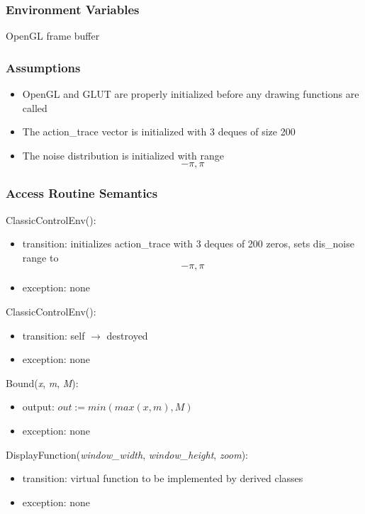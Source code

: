 \documentclass[12pt, titlepage]{article}
\begin{document}
\subsubsection{Environment Variables}
OpenGL frame buffer

\subsubsection{Assumptions}
\begin{itemize}
  \item OpenGL and GLUT are properly initialized before any drawing functions are called  
  \item The action\_trace vector is initialized with 3 deques of size 200
  \item The noise distribution is initialized with range \[-\pi, \pi\]

\end{itemize}
\begin{itemize}

\end{itemize}


\subsubsection{Access Routine Semantics}

\noindent ClassicControlEnv():
\begin{itemize}
  \item transition: initializes action\_trace with 3 deques of 200 zeros, sets dis\_noise range to\[-\pi, \pi\]
  
  \item exception: none

\end{itemize}


\noindent \texttildelow ClassicControlEnv():
\begin{itemize}
  \item transition: self $\rightarrow$ destroyed
  \item exception: none
\end{itemize}

\noindent Bound(\textit{x}, \textit{m}, \textit{M}):
\begin{itemize}
  \item output: $out := min(max(x, m), M)$
  \item exception: none
\end{itemize}

\noindent DisplayFunction(\textit{window\_width}, \textit{window\_height}, \textit{zoom}):
\begin{itemize}
\item transition: virtual function to be implemented by derived classes
\item exception: none
\end{itemize}
\end{document}

